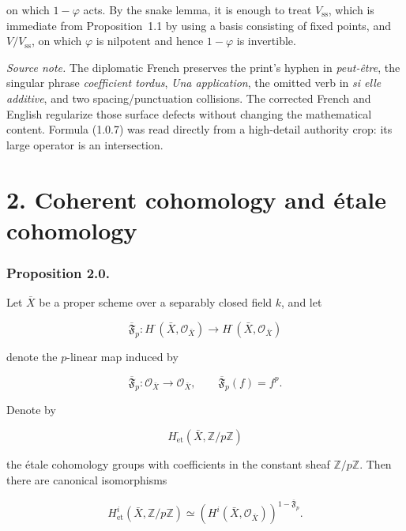 on which $1-\varphi$ acts. By the snake lemma, it is enough to treat
$V_{\mathrm{ss}}$, which is immediate from Proposition~1.1 by using a basis
consisting of fixed points, and $V/V_{\mathrm{ss}}$, on which $\varphi$ is
nilpotent and hence $1-\varphi$ is invertible.

\medskip
\noindent\emph{Source note.}
The diplomatic French preserves the print's hyphen in \emph{peut-être}, the
singular phrase \emph{coefficient tordus}, \emph{Una application}, the
omitted verb in \emph{si elle additive}, and two spacing/punctuation
collisions. The corrected French and English regularize those surface defects
without changing the mathematical content. Formula (1.0.7) was read directly
from a high-detail authority crop: its large operator is an intersection.

\section*{2. Coherent cohomology and étale cohomology}

\subsubsection*{Proposition 2.0.}
Let $\bar X$ be a proper scheme over a separably closed field $k$, and let

\begin{equation}\tag{2.0.1}
\overline{\mathfrak F}_p:H^{\cdot}(\bar X,\mathcal O_{\bar X})
\longrightarrow H^{\cdot}(\bar X,\mathcal O_{\bar X})
\end{equation}

denote the $p$-linear map induced by

\begin{equation}\tag{2.0.2}
\overline{\mathfrak F}_p:\mathcal O_{\bar X}\longrightarrow\mathcal O_{\bar X},
\qquad \overline{\mathfrak F}_p(f)=f^p.
\end{equation}

Denote by

\[
H^{\cdot}_{\mathrm{et}}(\bar X,\mathbb Z/p\mathbb Z)
\]

the étale cohomology groups with coefficients in the constant sheaf
$\mathbb Z/p\mathbb Z$. Then there are canonical isomorphisms

\begin{equation}\tag{2.0.3}
H^i_{\mathrm{et}}(\bar X,\mathbb Z/p\mathbb Z)
\simeq
(H^i(\bar X,\mathcal O_{\bar X}))^{1-\overline{\mathfrak F}_p}.
\end{equation}


